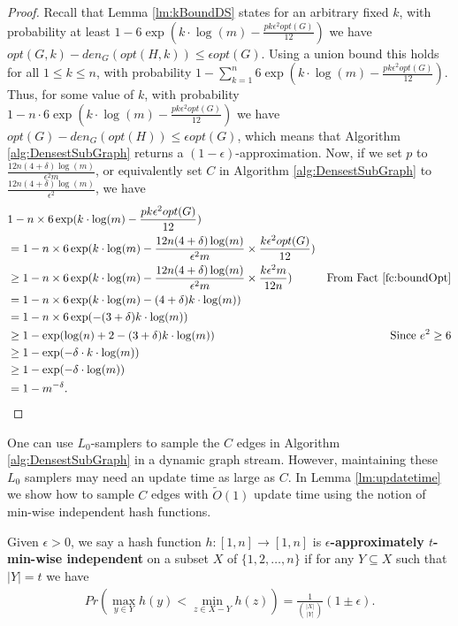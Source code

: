 \begin{proof}
	Recall that Lemma \ref{lm:kBoundDS} states for an arbitrary fixed $k$, with probability at least $1-6 \exp(k\cdot \log(m) -\frac{p k \epsilon^2  opt(G)} {12} )$ we have 
	$opt(G,k) - den_G(opt(H,k)) \leq \epsilon   opt(G)$. Using a union bound this holds for all $1\leq k\leq n$, with probability $1- \sum_{k=1}^n 6 \exp(k\cdot \log(m) -\frac{p k \epsilon^2  opt(G)} {12} )$. Thus, for some value of $k$, with probability $1-n \cdot 6 \exp(k\cdot \log(m) -\frac{p k \epsilon^2  opt(G)} {12} )$ we have $opt(G) - den_G(opt(H)) \leq \epsilon   opt(G)$, which means that Algorithm \ref{alg:DensestSubGraph} returns a $(1-\epsilon)$-approximation. Now, if we set $p$ to $\frac {12n (4+\delta) \log(m)} { \epsilon^2  m}$, or equivalently set $C$ in Algorithm \ref{alg:DensestSubGraph} to $\frac {12n (4+\delta) \log(m)} { \epsilon^2}$, we have
	\begin{align*}
		&1-n\times 6 \exp(k\cdot \log(m) -\frac{p k \epsilon^2  opt(G)} {12} ) \\
		&= 1-n\times 6 \exp(k\cdot \log(m) -\frac {12n (4+\delta) \log(m)} { \epsilon^2  m} \times\frac{ k \epsilon^2  opt(G)} {12} ) \\
		& \geq 1-n\times 6 \exp(k\cdot \log(m) -\frac {12n (4+\delta) \log(m)} { \epsilon^2  m} \times \frac{ k \epsilon^2  m} {12n} ) & \text{From Fact \ref{fc:boundOpt}}\\
		& = 1-n\times 6 \exp(k\cdot \log(m) -(4+\delta)k\cdot \log(m))\\
		& = 1-n\times 6 \exp(-(3 + \delta) k\cdot \log(m))\\
		& \geq 1- \exp(\log(n)+2 -(3 + \delta) k\cdot \log(m)) &\text{Since $e^2\geq 6$}\\
		& \geq 1- \exp(-\delta\cdot k\cdot \log(m))\\
		& \geq 1- \exp(-\delta\cdot \log(m))\\
		&=1- m^{-\delta}.
	\end{align*}
\end{proof}



One can use $L_0$-samplers \cite{jst11} 
to sample the $C$ edges in Algorithm \ref{alg:DensestSubGraph} in a dynamic graph stream. However, maintaining these $L_0$ samplers may need an update time as large as $C$.
In Lemma \ref{lm:updatetime} we show how to sample $C$ edges with $\tilde{O}(1)$ update time using the notion of min-wise independent hash functions.
\begin{definition}
Given $\epsilon > 0$, 
we say a hash function $h:[1,n]\rightarrow [1,n]$ is {\bf $\epsilon$-approximately $t$-min-wise independent} on a subset $X$ of $\{1, 2, \ldots, n\}$ 
if for any $Y\subseteq X$ such that $|Y|=t$ we have
\begin{align*}
Pr(\max_{y \in Y} h(y) < \min_{z\in X-Y} h(z)) = \frac1 {{|X| \choose |Y|}} (1 \pm \epsilon).
\end{align*}
\end{definition}

